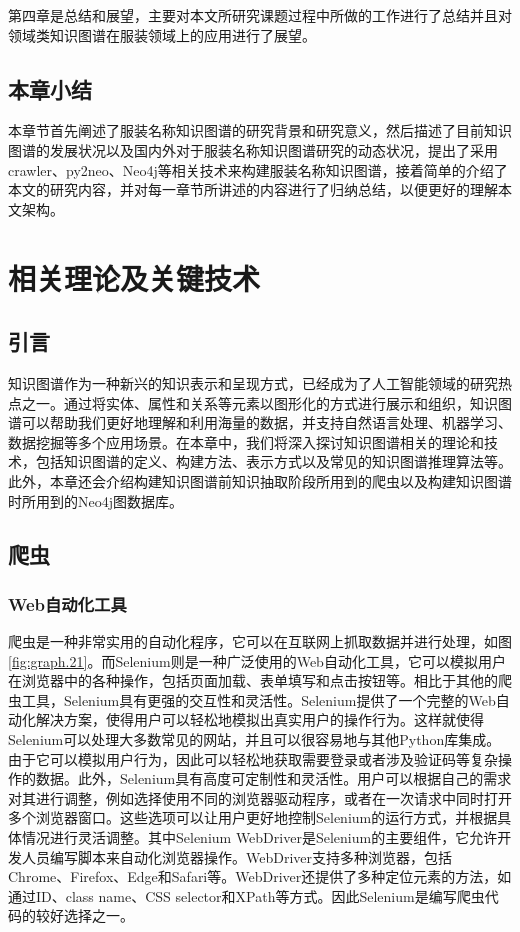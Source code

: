 \documentclass[bachelor_p]{hdu-thesis}
\begin{document}
第四章是总结和展望，主要对本文所研究课题过程中所做的工作进行了总结并且对领域类知识图谱在服装领域上的应用进行了展望。

\section{本章小结}

本章节首先阐述了服装名称知识图谱的研究背景和研究意义，然后描述了目前知识图谱的发展状况以及国内外对于服装名称知识图谱研究的动态状况，提出了采用crawler、py2neo、Neo4j等相关技术来构建服装名称知识图谱，接着简单的介绍了本文的研究内容，并对每一章节所讲述的内容进行了归纳总结，以便更好的理解本文架构。

\chapter{相关理论及关键技术}
\section{引言}
知识图谱作为一种新兴的知识表示和呈现方式，已经成为了人工智能领域的研究热点之一。通过将实体、属性和关系等元素以图形化的方式进行展示和组织，知识图谱可以帮助我们更好地理解和利用海量的数据，并支持自然语言处理、机器学习、数据挖掘等多个应用场景。在本章中，我们将深入探讨知识图谱相关的理论和技术，包括知识图谱的定义、构建方法、表示方式以及常见的知识图谱推理算法等。此外，本章还会介绍构建知识图谱前知识抽取阶段所用到的爬虫以及构建知识图谱时所用到的Neo4j图数据库。
\section{爬虫}
\subsection{Web自动化工具}

爬虫是一种非常实用的自动化程序，它可以在互联网上抓取数据并进行处理，如图\ref{fig:graph.21}。而Selenium则是一种广泛使用的Web自动化工具，它可以模拟用户在浏览器中的各种操作，包括页面加载、表单填写和点击按钮等。相比于其他的爬虫工具，Selenium具有更强的交互性和灵活性。Selenium提供了一个完整的Web自动化解决方案，使得用户可以轻松地模拟出真实用户的操作行为。这样就使得Selenium可以处理大多数常见的网站，并且可以很容易地与其他Python库集成。由于它可以模拟用户行为，因此可以轻松地获取需要登录或者涉及验证码等复杂操作的数据。此外，Selenium具有高度可定制性和灵活性。用户可以根据自己的需求对其进行调整，例如选择使用不同的浏览器驱动程序，或者在一次请求中同时打开多个浏览器窗口。这些选项可以让用户更好地控制Selenium的运行方式，并根据具体情况进行灵活调整。其中Selenium WebDriver是Selenium的主要组件，它允许开发人员编写脚本来自动化浏览器操作。WebDriver支持多种浏览器，包括Chrome、Firefox、Edge和Safari等。WebDriver还提供了多种定位元素的方法，如通过ID、class name、CSS selector和XPath等方式。因此Selenium是编写爬虫代码的较好选择之一。
\end{document}
